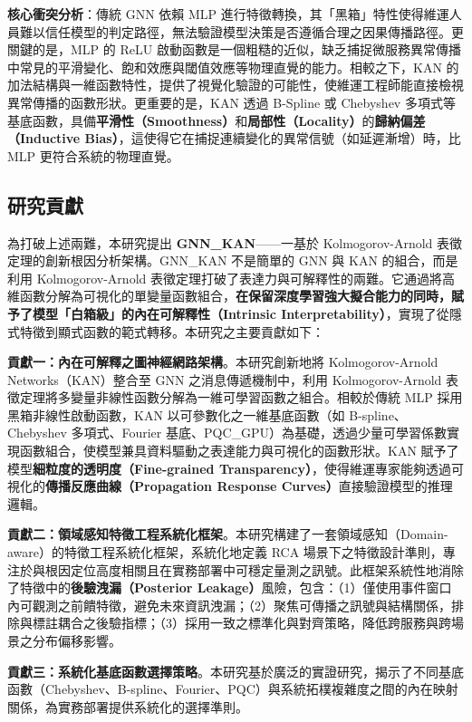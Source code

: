 \documentclass[10pt,a4paper,twocolumn]{article}
\begin{document}
\textbf{核心衝突分析}：傳統 GNN 依賴 MLP 進行特徵轉換，其「黑箱」特性使得維運人員難以信任模型的判定路徑，無法驗證模型決策是否遵循合理之因果傳播路徑。更關鍵的是，MLP 的 ReLU 啟動函數是一個粗糙的近似，缺乏捕捉微服務異常傳播中常見的平滑變化、飽和效應與閾值效應等物理直覺的能力。相較之下，KAN 的加法結構與一維函數特性，提供了視覺化驗證的可能性，使維運工程師能直接檢視異常傳播的函數形狀。更重要的是，KAN 透過 B-Spline 或 Chebyshev 多項式等基底函數，具備\textbf{平滑性（Smoothness）}和\textbf{局部性（Locality）}的\textbf{歸納偏差（Inductive Bias）}，這使得它在捕捉連續變化的異常信號（如延遲漸增）時，比 MLP 更符合系統的物理直覺。

\subsection{研究貢獻}

為打破上述兩難，本研究提出 \textbf{GNN\_KAN}——一基於 Kolmogorov-Arnold 表徵定理的創新根因分析架構。GNN\_KAN 不是簡單的 GNN 與 KAN 的組合，而是利用 Kolmogorov-Arnold 表徵定理打破了表達力與可解釋性的兩難。它通過將高維函數分解為可視化的單變量函數組合，\textbf{在保留深度學習強大擬合能力的同時，賦予了模型「白箱級」的內在可解釋性（Intrinsic Interpretability）}，實現了從隱式特徵到顯式函數的範式轉移。本研究之主要貢獻如下：

\textbf{貢獻一：內在可解釋之圖神經網路架構}。本研究創新地將 Kolmogorov-Arnold Networks（KAN）整合至 GNN 之消息傳遞機制中，利用 Kolmogorov-Arnold 表徵定理將多變量非線性函數分解為一維可學習函數之組合。相較於傳統 MLP 採用黑箱非線性啟動函數，KAN 以可參數化之一維基底函數（如 B-spline、Chebyshev 多項式、Fourier 基底、PQC\_GPU）為基礎，透過少量可學習係數實現函數組合，使模型兼具資料驅動之表達能力與可視化的函數形狀。KAN 賦予了模型\textbf{細粒度的透明度（Fine-grained Transparency）}，使得維運專家能夠透過可視化的\textbf{傳播反應曲線（Propagation Response Curves）}直接驗證模型的推理邏輯。

\textbf{貢獻二：領域感知特徵工程系統化框架}。本研究構建了一套領域感知（Domain-aware）的特徵工程系統化框架，系統化地定義 RCA 場景下之特徵設計準則，專注於與根因定位高度相關且在實務部署中可穩定量測之訊號。此框架系統性地消除了特徵中的\textbf{後驗洩漏（Posterior Leakage）}風險，包含：（1）僅使用事件窗口內可觀測之前饋特徵，避免未來資訊洩漏；（2）聚焦可傳播之訊號與結構關係，排除與標註耦合之後驗指標；（3）採用一致之標準化與對齊策略，降低跨服務與跨場景之分布偏移影響。

\textbf{貢獻三：系統化基底函數選擇策略}。本研究基於廣泛的實證研究，揭示了不同基底函數（Chebyshev、B-spline、Fourier、PQC）與系統拓樸複雜度之間的內在映射關係，為實務部署提供系統化的選擇準則。
\end{document}
